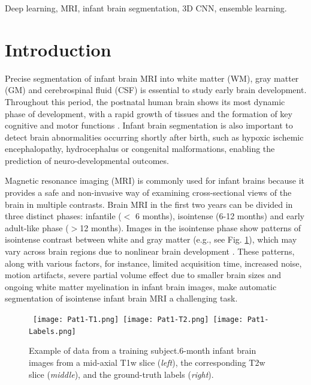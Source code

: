 \documentclass[twoside,espcrc2]{elsarticle}
\begin{document}
\begin{frontmatter}
\begin{abstract}
\end{abstract}

\begin{keyword}
Deep learning, MRI, infant brain segmentation, 3D CNN, ensemble learning.
\end{keyword}

\end{frontmatter}






\section{Introduction}

Precise segmentation of infant brain MRI into white matter (WM), gray matter (GM) and cerebrospinal fluid (CSF) is essential to study early brain development. Throughout this period, the postnatal human brain shows its most dynamic phase of development, with a rapid growth of tissues and the formation of key cognitive and motor functions \cite{paus2001maturation}. Infant brain segmentation is also important to detect brain abnormalities occurring shortly after birth, such as hypoxic ischemic encephalopathy, hydrocephalus or congenital malformations, enabling the prediction of neuro-developmental outcomes. 

Magnetic resonance imaging (MRI) is commonly used for infant brains because it provides a safe and non-invasive way of examining cross-sectional views of the brain in multiple contrasts. Brain MRI in the first two years can be divided in three distinct phases: infantile ($<$ 6 months), isointense (6-12 months) and early adult-like phase ($>$12 months). Images in the isointense phase show patterns of isointense contrast between white and gray matter (e.g., see Fig. \ref{fig:isointense}), which may vary across brain regions due to nonlinear brain development \cite{paus2001maturation}. These patterns, along with various factors, for instance, limited acquisition time, increased noise, motion artifacts, severe partial volume effect due to smaller brain sizes and ongoing white matter myelination in infant brain images, make automatic segmentation of isointense infant brain MRI a challenging task. 

\begin{figure}[ht!]
\begin{center}
     \mbox{
        \texttt{[image: Pat1-T1.png]}
        \hspace{-2.5 mm}
        \texttt{[image: Pat1-T2.png]}
        \hspace{-2.5 mm}
        \texttt{[image: Pat1-Labels.png]}
        }
\caption{Example of data from a training subject.6-month infant brain images from a mid-axial T1w slice (\textit{left}), the corresponding T2w slice (\textit{middle}), and the ground-truth labels (\textit{right}).}
\label{fig:isointense}
\end{center}
\end{figure}
\end{document}

